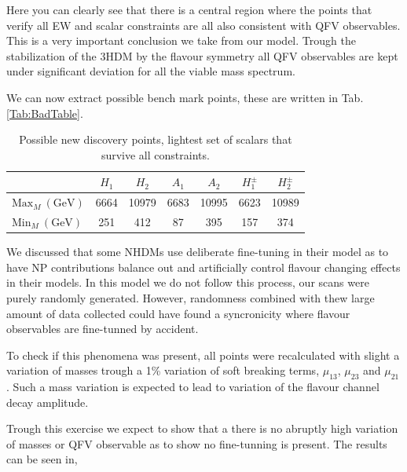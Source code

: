 Here you can clearly see that there is a central region where the points that verify all EW and scalar constraints are all also consistent with QFV observables. 
%
This is a very important conclusion we take from our model. Trough the stabilization of the 3HDM by the flavour symmetry all QFV observables are kept under significant deviation for all the viable mass spectrum.  

We can now extract possible bench mark points, these are written in Tab.\,\ref{Tab:BadTable}.
%
\begin{table}[H]
\label{tab:3HDM-Benchmarks-Mass}
\centering
\begin{tabular}{l|c|c|c|c|c|c|}
\cline{2-7}
                                                  & $H_1$ & $H_2$ & $A_1$ & $A_2$ & $H_1^\pm$ & $H_2^\pm$ \\ \hline
\multicolumn{1}{|l|}{$\text{Max}_M \ (\text{GeV})$} & 6664  & 10979 & 6683  & 10995 & 6623      & 10989     \\ \hline
\multicolumn{1}{|l|}{$\text{Min}_M \ (\text{GeV})$}              & 251   & 412   & 87    & 395   & 157       & 374       \\ \hline
\end{tabular}
\caption{Possible new discovery points, lightest set of scalars that survive all constraints.}
\end{table}

We discussed that some NHDMs use deliberate fine-tuning in their model as to have NP contributions balance out and artificially control flavour changing effects in their models. In this model we do not follow this process, our scans were purely randomly generated.  
%
However, randomness combined with thew large amount of data collected could have found a syncronicity where flavour observables are fine-tunned by accident. 
%

To check if this phenomena was present, all points were recalculated with slight a variation of masses trough a 1\% variation of soft breaking terms, $\mu_{13}$, $\mu_{23}$ and $\mu_{21}$. 
%
Such a mass variation is expected to lead to variation of the flavour channel decay amplitude. 

Trough this exercise we expect to show that a there is no abruptly high variation of masses or QFV observable as to show no fine-tunning is present.
% 
The results can be seen in, 

